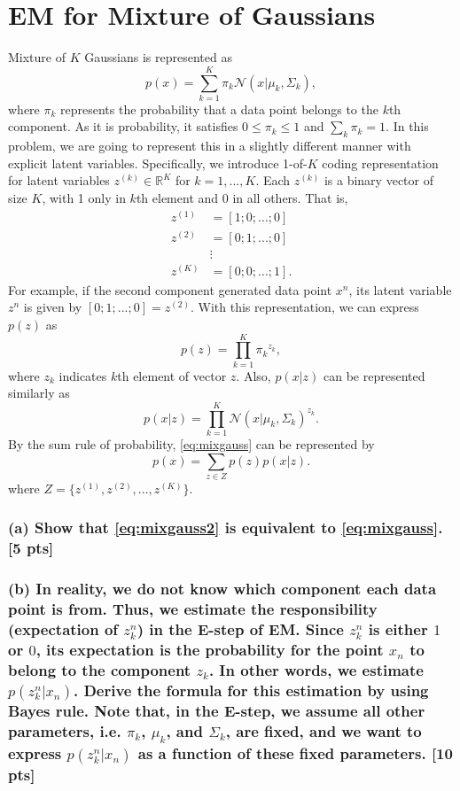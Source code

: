 \documentclass[twoside,10pt]{article}
\begin{document}
\section{EM for Mixture of Gaussians}
Mixture of $K$ Gaussians is represented as
\begin{equation}
p(x) = \sum_{k=1}^K \pi_k \mathcal{N}(x|\mu_k,
\Sigma_k),\label{eq:mixgauss}
\end{equation}
where $\pi_k$ represents the probability that a data point belongs
to the $k$th component. As it is probability, it satisfies $0 \le
\pi_k \le 1$ and $\sum_k \pi_k = 1$. In this problem, we are going
to represent this in a slightly different manner with explicit
latent variables. Specifically, we introduce 1-of-$K$ coding
representation for latent variables $z^{(k)} \in \mathbb{R}^K$ for
$k = 1, ..., K$. Each $z^{(k)}$ is a binary vector of size $K$, with
1 only in $k$th element and 0 in all others. That is,
\begin{align}
z^{(1)} &= [1; 0; ... ; 0]\nonumber\\
z^{(2)} &= [0; 1; ... ; 0]\nonumber\\
&\vdots\nonumber\\ z^{(K)} &= [0; 0; ... ; 1]\nonumber.
\end{align}
For example, if the second component generated data point $x^n$, its
latent variable $z^n$ is given by $[0; 1; ... ; 0] = z^{(2)}$. With
this representation, we can express $p(z)$ as
\begin{equation}
p(z) = \prod_{k=1}^K {\pi_k}^{z_k},\nonumber
\end{equation}
where $z_k$ indicates $k$th element of vector $z$. Also, $p(x|z)$
can be represented similarly as
\begin{equation}
p(x|z) = \prod_{k=1}^K \mathcal{N}(x|\mu_k,
\Sigma_k)^{z_k}.\nonumber
\end{equation}
By the sum rule of probability, \eqref{eq:mixgauss} can be
represented by
\begin{equation}
p(x) = \sum_{z \in Z} p(z) p(x|z).\label{eq:mixgauss2}
\end{equation}
where $Z = \{z^{(1)}, z^{(2)}, ..., z^{(K)}\}$.

\subsubsection*{(a) Show that \eqref{eq:mixgauss2} is equivalent to
\eqref{eq:mixgauss}. [5 pts]}

\subsubsection*{(b) In reality, we do not know which component each
data point is from. Thus, we estimate the responsibility
(expectation of $z_k^n$) in the E-step of EM. Since $z_k^n$ is either $1$ or $0$, its expectation is the
probability for the point $x_n$ to belong to the component $z_k$. In
other words, we estimate $p(z_k^n|x_n)$. Derive the formula for this
estimation by using Bayes rule. Note that, in the E-step, we assume all other parameters, i.e. $\pi_k$, $\mu_k$,
and $\Sigma_k$, are fixed, and we want to express $p(z_k^n|x_n)$ as a function of these fixed parameters. [10 pts]}
\end{document}
